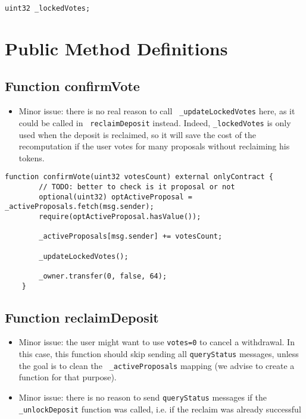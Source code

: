 \begin{lstlisting}[firstnumber=30]
    uint32 _lockedVotes;
\end{lstlisting}

\section{Public Method Definitions}


\subsection{Function confirmVote}

\begin{itemize}
\item Minor issue: there is no real reason to call {\tt
  \_updateLockedVotes} here, as it could be called in {\tt
  reclaimDeposit} instead. Indeed, {\tt \_lockedVotes} is only used
  when the deposit is reclaimed, so it will save the cost of the
  recomputation if the user votes for many proposals without
  reclaiming his tokens.
\end{itemize}

\begin{lstlisting}[firstnumber=74]
    function confirmVote(uint32 votesCount) external onlyContract {
        // TODO: better to check is it proposal or not
        optional(uint32) optActiveProposal = _activeProposals.fetch(msg.sender);
        require(optActiveProposal.hasValue());

        _activeProposals[msg.sender] += votesCount;
        
        _updateLockedVotes();

        _owner.transfer(0, false, 64);
    }
\end{lstlisting}

\subsection{Function reclaimDeposit}

\begin{itemize}
\item Minor issue: the user might want to use {\tt votes=0} to cancel
  a withdrawal. In this case, this function should skip sending all
  {\tt queryStatus} messages, unless the goal is to clean the {\tt
    \_activeProposals} mapping (we advise to create a function for that
  purpose).
\item Minor issue: there is no reason to send {\tt queryStatus}
  messages if the {\tt \_unlockDeposit} function was called, i.e. if
  the reclaim was already successful
\end{itemize}

